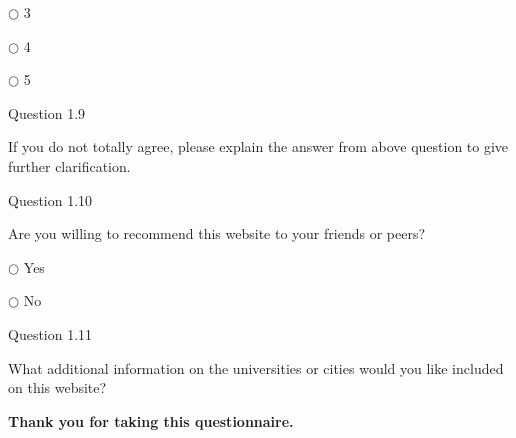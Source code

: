 $\bigcirc $ 3

$\bigcirc $ 4

$\bigcirc $ 5

Question 1.9

If you do not totally agree, please explain the answer from above question 
to give further clarification.

Question 1.10

Are you willing to recommend this website to your friends or peers? 

$\bigcirc $ Yes

$\bigcirc $ No

Question 1.11

What additional information on the universities or cities would you like 
included on this website?

\begin{center}
\textbf{Thank you for taking this questionnaire.}
\end{center}

